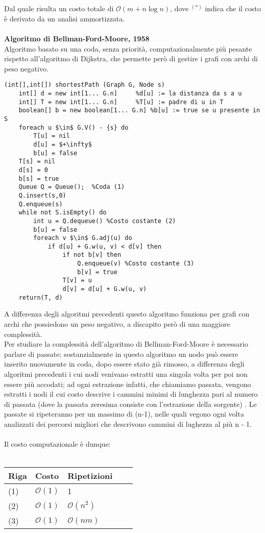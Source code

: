 \documentclass[../cheatSheetAlgoritmi.tex]{subfiles}
\begin{document}
\\\\
Dal quale risulta un costo totale di $\mathcal{O}(m + n \log n)$, dove $^{(*)}$ indica che il costo è derivato da un analisi ammortizzata. \\\\
\textbf{Algoritmo di Bellman-Ford-Moore, 1958} \\
Algoritmo basato su una coda, senza priorità, computazionalmente più pesante rispetto all'algoritmo di Dijkstra, che permette però di gestire i grafi con archi di peso negativo.
\begin{lstlisting}[caption=Algoritmo di Bellman-Ford-Moore: cammini minimi a sorgente singola]
(int[],int[]) shortestPath (Graph G, Node s)
	int[] d = new int[1... G.n]		%d[u] := la distanza da s a u 
	int[] T = new int[1... G.n]		%T[u] := padre di u in T
	boolean[] b = new boolean[1... G.n]	%b[u] := true se u presente in S 
	foreach u $\in$ G.V() - {s} do
		T[u] = nil
		d[u] = $+\infty$
		b[u] = false
	T[s] = nil
	d[s] = 0
	b[s] = true
	Queue Q = Queue();	%Coda (1)
	Q.insert(s,0)
	Q.enqueue(s)
	while not S.isEmpty() do 
		int u = Q.dequeue()	%Costo costante (2)
		b[u] = false
		foreach v $\in$ G.adj(u) do
			if d[u] + G.w(u, v) < d[v] then 
				if not b[v] then
					Q.enqueue(v) %Costo costante (3)
					b[v] = true
				T[v] = u 
				d[v] = d[u] + G.w(u, v)
	return(T, d)
\end{lstlisting}
A differenza degli algoritmi precedenti questo algoritmo funziona per grafi con archi che possiedono un peso negativo, a discapito però di una maggiore complessità. \\ Per studiare la complessità dell'algoritmo di Bellman-Ford-Moore è necessario parlare di passate; sostanzialmente in questo algoritmo un nodo può essere inserito nuovamente in coda, dopo essere stato già rimosso, a differenza degli algoritmi precedenti i cui nodi venivano estratti una singola volta per poi non essere più accodati; ad ogni estrazione infatti, che chiamiamo passata, vengono estratti i nodi il cui costo descrive i cammini minimi di lunghezza pari al numero di passata (dove la passata zeresima consiste con l'estrazione della sorgente) . Le passate si ripeteranno per un massimo di (n-1), nelle quali vegono ogni volta analizzati dei percorsi migliori che descrivono cammini di lughezza al più n - 1. \\\\
Il costo computazionale è dunque:
\\\\
\begin{tabular}{@{}lllll@{}}
\toprule
Riga & Costo & Ripetizioni &  &  \\ \midrule
(1) & $\mathcal{O}(1)$     & 1           &  &  \\
(2)    & $\mathcal{O}(1)$     & $\mathcal{O}(n^2)$           &  &  \\
(3)    & $\mathcal{O}(1)$     & $\mathcal{O}(nm)$           &  &  \\ \bottomrule
\end{tabular}
\end{document}
